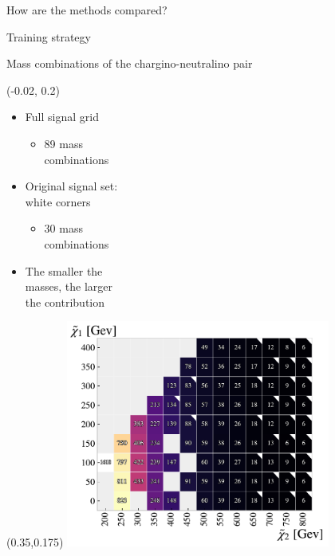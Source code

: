 \documentclass[UKenglish]{beamer}
\begin{document}
\begin{frame}{How are the methods compared?}

\end{frame}

\begin{frame}{Training strategy}
 
\end{frame}

\begin{frame}{Mass combinations of the chargino-neutralino pair}
    \begin{textblock}{1}(-0.02, 0.2)
        \begin{itemize}
            \item Full signal grid
            \begin{itemize}
                \item 89 mass\\ combinations
            \end{itemize}
            \item Original signal set: \\white corners
            \begin{itemize}
                \item 30 mass \\combinations
            \end{itemize}
            \item The smaller the \\masses,
                  the larger\\ the contribution            
        \end{itemize}
    \end{textblock}
    \begin{textblock}{1.0}(0.35,0.175)
        \includegraphics[width=0.65\textwidth]{figures/Signal/NrSignalEvents.pdf}
    \end{textblock}
\end{frame}
\end{document}
